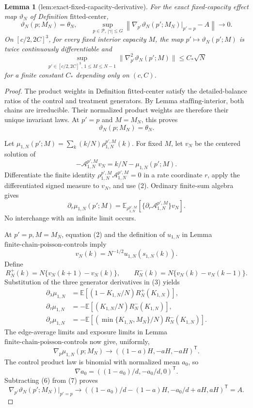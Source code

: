 \documentclass{article}
\newtheorem{lemma}{Lemma}
\begin{document}
\begin{lemma}[lem:exact-fixed-capacity-derivative]\label{lem:exact-fixed-capacity-derivative}
For the exact fixed-capacity effect map \(\vartheta_N\) of Definition \(\mathrm{fitted\mbox{-}center}\),
\[
 \vartheta_N(p;M_N)=\theta_N,
 \qquad
 \sup_{p\in\mathcal P,\,|\gamma|\leq G}
 \left\|\nabla_{p'}\vartheta_N(p';M_N)\big|_{p'=p}-A\right\|\longrightarrow0. \tag{11}
\]
On \([c/2,2C]^3\), for every fixed interior capacity \(M\), the map \(p'\mapsto\vartheta_N(p';M)\) is twice continuously differentiable and
\[
 \sup_{p'\in[c/2,2C]^3,\,1\leq M\leq N-1}
 \|\nabla_{p'}^2\vartheta_N(p';M)\|\leq C_*\sqrt N             \tag{12}
\]
for a finite constant \(C_*\) depending only on \((c,C)\).
\end{lemma}
\begin{proof}
The product weights in Definition \(\mathrm{fitted\mbox{-}center}\) satisfy the detailed-balance ratios of the control and treatment generators.  By Lemma \(\mathrm{staffing\mbox{-}interior}\), both chains are irreducible.  Their normalized product weights are therefore their unique invariant laws.  At \(p'=p\) and \(M=M_N\), this proves
\[
 \vartheta_N(p;M_N)=\theta_N.                                 \tag{1}
\]

Let \(\mu_{1,N}(p';M)=\sum_k(k/N)\rho_{1,N}^{p',M}(k)\).  For fixed \(M\), let \(v_N\) be the centered solution of
\[
 -\mathcal A_{1,N}^{p',M}v_N=k/N-\mu_{1,N}(p';M).             \tag{2}
\]
Differentiate the finite identity \(\rho_{1,N}^{p',M}\mathcal A_{1,N}^{p',M}=0\) in a rate coordinate \(r\), apply the differentiated signed measure to \(v_N\), and use (2).  Ordinary finite-sum algebra gives
\[
 \partial_r\mu_{1,N}(p';M)
 =\mathbb E_{\rho_{1,N}^{p',M}}
 [\{\partial_r\mathcal A_{1,N}^{p',M}\}v_N].                \tag{3}
\]
No interchange with an infinite limit occurs.

At \(p'=p,M=M_N\), equation (2) and the definition of \(u_{1,N}\) in Lemma \(\mathrm{finite\mbox{-}chain\mbox{-}poisson\mbox{-}controls}\) imply
\[
 v_N(k)=N^{-1/2}u_{1,N}(s_{1,N}(k)).                           \tag{4}
\]
Define
\[
 R_N^+(k)=N\{v_N(k+1)-v_N(k)\},
 \qquad
 R_N^-(k)=N\{v_N(k)-v_N(k-1)\}.
\]
Substitution of the three generator derivatives in (3) yields
\[
 \begin{split}
 \partial_\lambda\mu_{1,N}
 &=\mathbb E[(1-K_{1,N}/N)R_N^+(K_{1,N})],\\
 \partial_\tau\mu_{1,N}
 &=-\mathbb E[(K_{1,N}/N)R_N^-(K_{1,N})],\\
 \partial_\nu\mu_{1,N}
 &=-\mathbb E[(\min\{K_{1,N},M_N\}/N)R_N^-(K_{1,N})].        \tag{5}
 \end{split}
\]
The edge-average limits and exposure limits in Lemma \(\mathrm{finite\mbox{-}chain\mbox{-}poisson\mbox{-}controls}\) now give, uniformly,
\[
 \nabla_p\mu_{1,N}(p;M_N)
 \longrightarrow((1-a)H,-aH,-aH)^{\mathsf T}.                \tag{6}
\]
The control product law is binomial with normalized mean \(a_0\), so
\[
 \nabla a_0=((1-a_0)/d,-a_0/d,0)^{\mathsf T}.                 \tag{7}
\]
Subtracting (6) from (7) proves
\[
 \nabla_{p'}\vartheta_N(p';M_N)|_{p'=p}
 \longrightarrow((1-a_0)/d-(1-a)H,-a_0/d+aH,aH)^{\mathsf T}=A. \tag{8}
\]


\end{proof}
\end{document}

